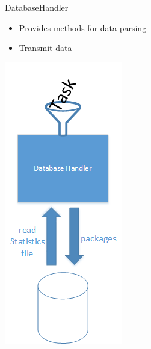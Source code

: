 	\begin{frame}{DatabaseHandler}
	
	\begin{minipage}[]{.5\textwidth}%
	\begin{itemize}
		\item<2->{} {Provides methods for data parsing}
		\item<3->{} {Transmit data}
	\end{itemize}
	\end{minipage}	
	\begin{minipage}[]{.25\textwidth}%
	\vspace{-\ht\strutbox}\includegraphics[width=\textwidth]{images/zeichnunghandler.png}
	\end{minipage}%
	

\end{frame}
